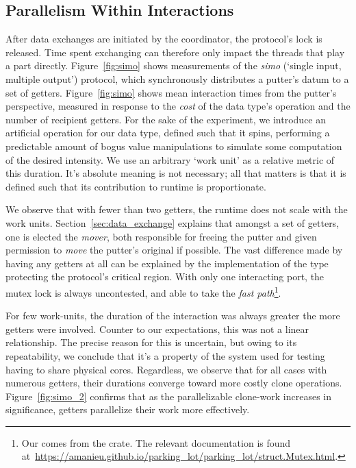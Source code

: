 \subsection{Parallelism Within Interactions}
After data exchanges are initiated by the coordinator, the protocol's lock is released. Time spent exchanging can therefore only impact the threads that play a part directly. Figure~\ref{fig:simo} shows measurements of the \textit{simo} (`single input, multiple output') protocol, which synchronously distributes a putter's datum to a set of getters. Figure~\ref{fig:simo} shows mean interaction times from the putter's perspective, measured in response to the \textit{cost} of the data type's  operation and the number of recipient getters. For the sake of the experiment, we introduce an artificial  operation for our data type, defined such that it spins, performing a predictable amount of bogus value manipulations to simulate some computation of the desired intensity. We use an arbitrary `work unit' as a relative metric of this duration. It's absolute meaning is not necessary; all that matters is that it is defined such that its contribution to runtime is proportionate.

We observe that with fewer than two getters, the runtime does not scale with the work units. Section~\ref{sec:data_exchange} explains that amongst a set of getters, one is elected the \textit{mover}, both responsible for freeing the putter and given permission to \textit{move} the putter's original if possible. The vast difference made by having any getters at all can be explained by the implementation of the  type protecting the protocol's critical region. With only one interacting port, the mutex lock is always uncontested, and able to take the \textit{fast path}\footnote{Our  comes from the  crate. The relevant documentation is found at~\url{https://amanieu.github.io/parking_lot/parking_lot/struct.Mutex.html}.}.

For few work-units, the duration of the interaction was always greater the more getters were involved. Counter to our expectations, this was not a linear relationship. The precise reason for this is uncertain, but owing to its repeatability, we conclude that it's a property of the system used for testing having to share physical cores. Regardless, we observe that for all cases with numerous getters, their durations converge toward more costly clone operations. Figure~\ref{fig:simo_2} confirms that as the parallelizable clone-work increases in significance, getters parallelize their work more effectively.

